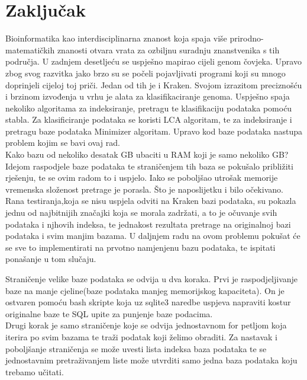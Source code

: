 \documentclass[times, utf8, zavrsni]{fer}
\begin{document}
\chapter{Zaključak}
Bioinformatika kao interdisciplinarna znanost koja spaja više prirodno-matematičkih znanosti otvara vrata za ozbiljnu suradnju znanstvenika s tih područja. U zadnjem desetljeću se uspješno mapirao cijeli genom čovjeka. Upravo zbog svog razvitka jako brzo su se počeli pojavljivati programi koji su mnogo doprinjeli cijeloj toj priči. Jedan od tih je i Kraken. Svojom izrazitom preciznošću i brzinom izvođenja u vrhu je alata za  klasifikaciranje genoma. Uspješno spaja nekoliko algoritama za indeksiranje, pretragu te klasifikaciju podataka pomoću stabla. Za klasificiranje podataka se koristi LCA algoritam, te za indeksiranje i pretragu baze podataka Minimizer algoritam. Upravo kod baze podataka nastupa problem kojim se bavi ovaj rad. \\Kako bazu od nekoliko desatak GB ubaciti u RAM koji je samo nekoliko GB? \\Idejom raspodjele baze podataka te straničenjem tih baza se pokušalo približiti rješenju, te se ovim radom to i uspjelo. Iako se poboljšao utrošak memorije vremenska složenost pretrage je porasla. Što je naposlijetku i bilo očekivano. Rana testiranja,koja se nisu uspjela odviti na Kraken bazi podataka, su pokazla jednu od najbitnijih značajki koja se morala zadržati, a to je očuvanje svih podataka i njhovih indeksa, te jednakost rezultata pretrage na originalnoj bazi podataka i svim manjim bazama. U daljnjem radu na ovom problemu pokušat će se sve to implementirati na prvotno namjenjenu bazu podataka, te ispitati ponašanje u tom slučaju.





\begin{sazetak}
Straničenje velike baze podataka se odvija u dva koraka. Prvi je raspodjeljivanje baze na manje cjeline(baze podataka manjeg memorijskog kapaciteta). On je ostvaren pomoću bash skripte koja uz sqlite3 naredbe uspjeva napraviti kostur originalne baze te SQL upite za punjenje baze podacima.\\
Drugi  korak je samo straničenje koje se odvija jednostavnom for petljom koja iterira po svim bazama te traži podatak koji želimo obraditi. Za nastavak i poboljšanje straničenja se može uvesti lista indeksa baza podataka te se jednostavnim pretraživanjem liste može utvrditi samo jedna baza podataka koju trebamo učitati.

\end{sazetak}
\end{document}
